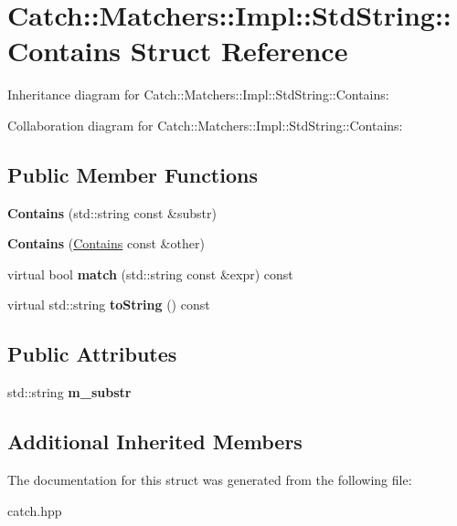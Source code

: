 \hypertarget{struct_catch_1_1_matchers_1_1_impl_1_1_std_string_1_1_contains}{}\section{Catch\+:\+:Matchers\+:\+:Impl\+:\+:Std\+String\+:\+:Contains Struct Reference}
\label{struct_catch_1_1_matchers_1_1_impl_1_1_std_string_1_1_contains}


Inheritance diagram for Catch\+:\+:Matchers\+:\+:Impl\+:\+:Std\+String\+:\+:Contains\+:


Collaboration diagram for Catch\+:\+:Matchers\+:\+:Impl\+:\+:Std\+String\+:\+:Contains\+:
\subsection*{Public Member Functions}
\begin{DoxyCompactItemize}
\item 
\mbox{\label{struct_catch_1_1_matchers_1_1_impl_1_1_std_string_1_1_contains_ac6f13133724bfd5796e8ee4ea8f2c0e3}} 
{\bfseries Contains} (std\+::string const \&substr)
\item 
\mbox{\label{struct_catch_1_1_matchers_1_1_impl_1_1_std_string_1_1_contains_ad6b1ef653dfcb3bab43c43be043dc4e8}} 
{\bfseries Contains} (\hyperlink{struct_catch_1_1_matchers_1_1_impl_1_1_std_string_1_1_contains}{Contains} const \&other)
\item 
\mbox{\label{struct_catch_1_1_matchers_1_1_impl_1_1_std_string_1_1_contains_a2248f3d0d1eb5cf5a1059c183b811a7c}} 
virtual bool {\bfseries match} (std\+::string const \&expr) const
\item 
\mbox{\label{struct_catch_1_1_matchers_1_1_impl_1_1_std_string_1_1_contains_aed168ddff5bce9295aec5c7daca89849}} 
virtual std\+::string {\bfseries to\+String} () const
\end{DoxyCompactItemize}
\subsection*{Public Attributes}
\begin{DoxyCompactItemize}
\item 
\mbox{\label{struct_catch_1_1_matchers_1_1_impl_1_1_std_string_1_1_contains_a0bad82dd7cbdd0ec06b6d562181db03e}} 
std\+::string {\bfseries m\+\_\+substr}
\end{DoxyCompactItemize}
\subsection*{Additional Inherited Members}


The documentation for this struct was generated from the following file\+:\begin{DoxyCompactItemize}
\item 
catch.\+hpp\end{DoxyCompactItemize}
